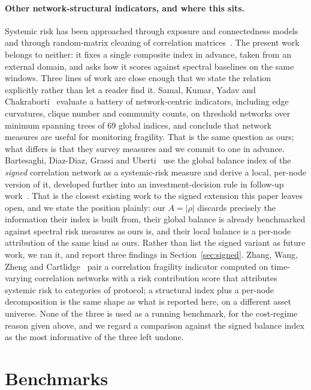 \documentclass[11pt,a4paper]{article}
\begin{document}
\paragraph{Other network-structural indicators, and where this sits.} Systemic
risk has been approached through exposure and connectedness
models~\cite{diebold2014,acemoglu2015,billio2012} and through random-matrix
cleaning of correlation matrices~\cite{laloux1999,plerou2002}. The present
work belongs to neither: it fixes a single composite index in advance, taken
from an external domain, and asks how it scores against spectral baselines on
the same windows. Three lines of work are close enough that we state the
relation explicitly rather than let a reader find it. Samal, Kumar, Yadav and
Chakraborti~\cite{samal2021fin} evaluate a battery of network-centric
indicators, including edge curvatures, clique number and community counts, on
threshold networks over minimum spanning trees of 69 global indices, and
conclude that network measures are useful for monitoring fragility. That is
the same question as ours; what differs is that they survey measures and we
commit to one in advance. Bartesaghi, Diaz-Diaz, Grassi and
Uberti~\cite{bartesaghi2025} use the global balance index of the
\emph{signed} correlation network as a systemic-risk measure and derive a
local, per-node version of it, developed further into an investment-decision
rule in follow-up work~\cite{bartesaghi2025local}. That is the closest existing
work to the signed extension this paper leaves open, and we state the position
plainly: our $A = |\rho|$ discards precisely the information their index is
built from, their global balance is already benchmarked against spectral risk
measures as ours is, and their local balance is a per-node attribution of the
same kind as ours. Rather than list the signed variant as future work, we ran
it, and report three findings in Section~\ref{sec:signed}. Zhang, Wang, Zheng and
Cartlidge~\cite{zhang2026defi} pair a correlation fragility indicator computed
on time-varying correlation networks with a risk contribution score that
attributes systemic risk to categories of protocol; a structural index plus a
per-node decomposition is the same shape as what is reported here, on a
different asset universe. None of the three is used as a running benchmark,
for the cost-regime reason given above, and we regard a comparison against the
signed balance index as the most informative of the three left undone.


\section{Benchmarks}
\label{sec:benchmarks}
\end{document}
